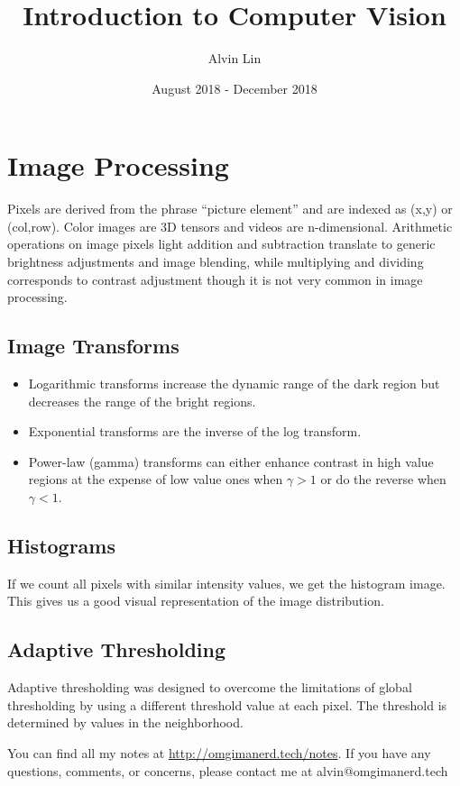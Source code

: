 \documentclass{math}
\title{Introduction to Computer Vision}
\author{Alvin Lin}
\date{August 2018 - December 2018}
\begin{document}
\maketitle

\section*{Image Processing}
Pixels are derived from the phrase ``picture element'' and are indexed as
(x,y) or (col,row). Color images are 3D tensors and videos are n-dimensional.
Arithmetic operations on image pixels light addition and subtraction translate
to generic brightness adjustments and image blending, while multiplying and
dividing corresponds to contrast adjustment though it is not very common in
image processing.

\subsection*{Image Transforms}
\begin{itemize}
  \item Logarithmic transforms increase the dynamic range of the dark region but
    decreases the range of the bright regions.
  \item Exponential transforms are the inverse of the log transform.
  \item Power-law (gamma) transforms can either enhance contrast in high value
    regions at the expense of low value ones when \( \gamma > 1 \) or do the
    reverse when \( \gamma < 1 \).
\end{itemize}

\subsection*{Histograms}
If we count all pixels with similar intensity values, we get the histogram
image. This gives us a good visual representation of the image distribution.

\subsection*{Adaptive Thresholding}
Adaptive thresholding was designed to overcome the limitations of global
thresholding by using a different threshold value at each pixel. The threshold
is determined by values in the neighborhood.

\begin{center}
  You can find all my notes at \url{http://omgimanerd.tech/notes}. If you have
  any questions, comments, or concerns, please contact me at
  alvin@omgimanerd.tech
\end{center}
\end{document}
